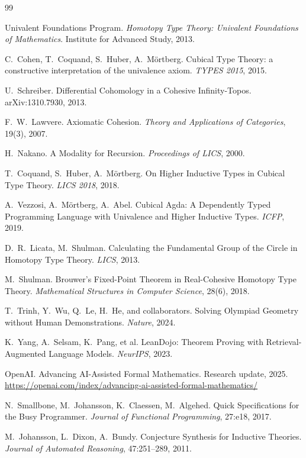 \documentclass[11pt,a4paper]{article}
\theoremstyle{plain}
\theoremstyle{definition}
\theoremstyle{remark}
\begin{document}
\begin{thebibliography}{99}

Univalent Foundations Program.
\textit{Homotopy Type Theory: Univalent Foundations of Mathematics}.
Institute for Advanced Study, 2013.

C.~Cohen, T.~Coquand, S.~Huber, A.~M\"ortberg.
Cubical Type Theory: a constructive interpretation of the univalence axiom.
\textit{TYPES 2015}, 2015.

U.~Schreiber.
Differential Cohomology in a Cohesive Infinity-Topos.
arXiv:1310.7930, 2013.

F.~W.~Lawvere.
Axiomatic Cohesion.
\textit{Theory and Applications of Categories}, 19(3), 2007.

H.~Nakano.
A Modality for Recursion.
\textit{Proceedings of LICS}, 2000.

T.~Coquand, S.~Huber, A.~M\"ortberg.
On Higher Inductive Types in Cubical Type Theory.
\textit{LICS 2018}, 2018.

A.~Vezzosi, A.~M\"ortberg, A.~Abel.
Cubical Agda: A Dependently Typed Programming Language with Univalence and Higher Inductive Types.
\textit{ICFP}, 2019.

D.~R.~Licata, M.~Shulman.
Calculating the Fundamental Group of the Circle in Homotopy Type Theory.
\textit{LICS}, 2013.

M.~Shulman.
Brouwer's Fixed-Point Theorem in Real-Cohesive Homotopy Type Theory.
\textit{Mathematical Structures in Computer Science}, 28(6), 2018.

T.~Trinh, Y.~Wu, Q.~Le, H.~He, and collaborators.
Solving Olympiad Geometry without Human Demonstrations.
\textit{Nature}, 2024.

K.~Yang, A.~Selsam, K.~Pang, et al.
LeanDojo: Theorem Proving with Retrieval-Augmented Language Models.
\textit{NeurIPS}, 2023.

OpenAI.
Advancing AI-Assisted Formal Mathematics.
Research update, 2025.
\url{https://openai.com/index/advancing-ai-assisted-formal-mathematics/}

N.~Smallbone, M.~Johansson, K.~Claessen, M.~Algehed.
Quick Specifications for the Busy Programmer.
\textit{Journal of Functional Programming}, 27:e18, 2017.

M.~Johansson, L.~Dixon, A.~Bundy.
Conjecture Synthesis for Inductive Theories.
\textit{Journal of Automated Reasoning}, 47:251--289, 2011.


\end{thebibliography}
\end{document}
